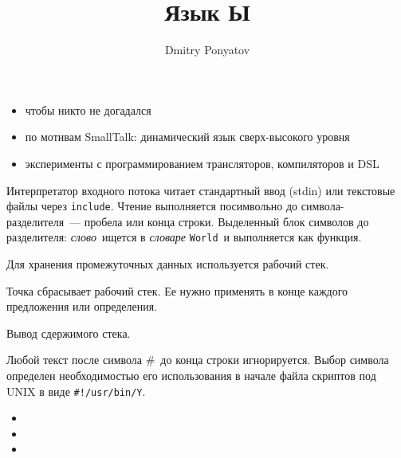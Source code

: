 



\author{Dmitry Ponyatov }
\title{Язык Ы}




\tableofcontents

\secdown


\begin{itemize}[nosep]
  \item чтобы никто не догадался
  \item по мотивам SmallTalk: динамический язык сверх-высокого уровня
  \item эксперименты с программированием трансляторов, компиляторов и DSL
\end{itemize}

\secdown


Интерпретатор входного потока читает стандартный ввод (stdin) или текстовые
файлы через \verb|include|. Чтение выполняется посимвольно до
символа-разделителя\ --- пробела или конца строки. Выделенный блок символов 
до разделителя: \emph{слово}\ ищется в \emph{словаре} \verb|World|\ и
выполняется как функция.

\secdown

Для хранения промежуточных данных используется рабочий стек.


Точка сбрасывает рабочий стек. Ее нужно применять в конце каждого предложения
или определения.


Вывод сдержимого стека.

\secup


\secup

\secdown


Любой текст после символа \#\ до конца строки игнорируется.
Выбор символа определен необходимостью его использования в начале файла
скриптов под UNIX в виде \verb|#!/usr/bin/Y|.

\secdown



\secup

\secup


\begin{itemize}[nosep]
  \item {}
  \item {}
  \item {}
\end{itemize}



